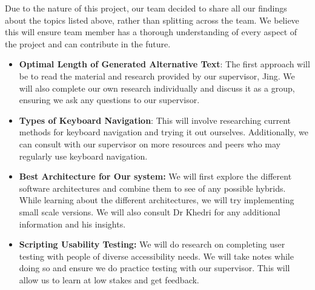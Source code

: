 \begin{enumerate}
  Due to the nature of this project, our team decided to share all our findings about the topics listed above, rather than splitting across the team. 
  We believe this will ensure team member has a thorough understanding of every aspect of the project and can contribute in the future. 
  \begin{itemize}
    \item \textbf{Optimal Length of Generated Alternative Text}: The first approach will be to read the material and research provided by our supervisor, Jing. 
    We will also complete our own research individually and discuss it as a group, ensuring we ask any questions to our supervisor. 
    \item \textbf{Types of Keyboard Navigation}: This will involve researching current methods for keyboard navigation and trying it out ourselves. Additionally, we can consult with our supervisor on more resources and peers who may regularly use keyboard navigation.
    \item \textbf{Best Architecture for Our system:} We will first explore the different software architectures and combine them to see of any possible hybrids. While learning about the different architectures, we will try implementing small scale versions. We will also consult Dr Khedri for any additional information and his insights.
    \item \textbf{Scripting Usability Testing:} We will do research on completing user testing with people of diverse accessibility needs. We will take notes while doing so and ensure we do practice testing with our supervisor. This will allow us to learn at low stakes and get feedback. 
  \end{itemize}


\end{enumerate}


